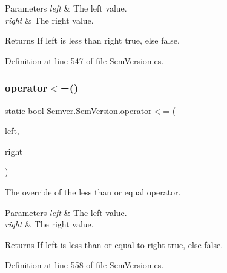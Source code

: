 \begin{DoxyParams}{Parameters}
{\em left} & The left value.\\
\hline
{\em right} & The right value.\\
\hline
\end{DoxyParams}
\begin{DoxyReturn}{Returns}
If left is less than right {\ttfamily true}, else {\ttfamily false}.
\end{DoxyReturn}


Definition at line 547 of file Sem\+Version.\+cs.

\mbox{\label{class_semver_1_1_sem_version_a235b920e8e35516c891e59f8bf5b9aef}} 
\subsubsection{\texorpdfstring{operator$<$=()}{operator<=()}}
{\footnotesize\ttfamily static bool Semver.\+Sem\+Version.\+operator$<$= (\begin{DoxyParamCaption}\item[{\mbox{\hyperlink{class_semver_1_1_sem_version}{Sem\+Version}}}]{left,  }\item[{\mbox{\hyperlink{class_semver_1_1_sem_version}{Sem\+Version}}}]{right }\end{DoxyParamCaption})\hspace{0.3cm}{\ttfamily [static]}}



The override of the less than or equal operator. 


\begin{DoxyParams}{Parameters}
{\em left} & The left value.\\
\hline
{\em right} & The right value.\\
\hline
\end{DoxyParams}
\begin{DoxyReturn}{Returns}
If left is less than or equal to right {\ttfamily true}, else {\ttfamily false}.
\end{DoxyReturn}


Definition at line 558 of file Sem\+Version.\+cs.

\mbox{\label{class_semver_1_1_sem_version_aff575c02e2b0eaa74e2aee6da139f315}} 
